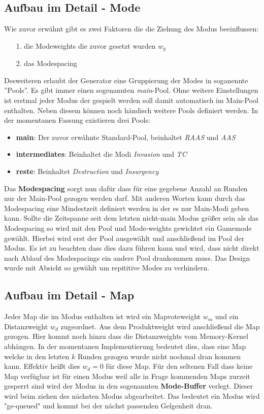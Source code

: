     \subsection{Aufbau im Detail - Mode}
        Wie zuvor erwähnt gibt es zwei Faktoren die die Ziehung des Modus beeinflussen:
        \begin{itemize}
            \item [1.] die Modeweights die zuvor gesetzt wurden $w_g$ 
            \item [2.] das Modespacing
        \end{itemize}
        Desweiteren erlaubt der Generator eine Gruppierung der Modes in soganennte ''Pools''. 
        Es gibt immer einen sogenannten \textit{main}-Pool. 
        Ohne weitere Einstellungen ist erstmal jeder Modus der gespielt werden soll damit automatisch im Main-Pool enthalten. 
        Neben diesem können noch händisch weitere Pools definiert werden. 
        In der momentanen Fassung existieren drei Pools:
        \begin{itemize}
            \item \textbf{main}: Der zuvor erwähnte Standard-Pool, beinhaltet \textit{RAAS} und \textit{AAS}
            \item \textbf{intermediates}: Beinhaltet die Modi \textit{Invasion} und \textit{TC}
            \item \textbf{reste}: Beinhaltet \textit{Destruction} und \textit{Insurgency}
        \end{itemize}
        Das \textbf{Modespacing} sorgt nun dafür dass für eine gegebene Anzahl an Runden nur der Main-Pool gezogen werden darf.
        Mit anderen Worten kann durch das Modespacing eine Mindestzeit definiert werden in der es nur Main-Modi geben kann. 
        Sollte die Zeitspanne seit dem letzten nicht-main Modus größer sein als das Modespacing so wird mit den Pool und Mode-weights gewichtet ein Gamemode gewählt. 
        Hierbei wird erst der Pool ausgewählt und anschließend im Pool der Modus. 
        Es ist zu beachten dass dies dazu führen kann und wird, dass nicht direkt nach Ablauf des Modespacings ein andere Pool drankommen muss. 
        Das Design wurde mit Absicht so gewählt um repititive Modes zu verhindern.

    \subsection{Aufbau im Detail - Map}
    Jeder Map die im Modus enthalten ist wird ein Mapvoteweight $w_m$ und ein Distanzweight $w_d$ zugeordnet. 
    Aus dem Produktweight wird anschließend die Map gezogen. 
    Hier kommt noch hinzu dass die Distanzweights vom Memory-Kernel abhängen. 
    In der momentanen Implementierung bedeutet dies, dass eine Map welche in den letzten $k$ Runden gezogen wurde nicht nochmal dran kommen kann. 
    Effektiv heißt dies $w_d=0$ für diese Map. 
    Für den seltenen Fall dass keine Map verfügbar ist für einen Modus weil alle in Frage kommenden Maps zurzeit gesperrt sind wird der Modus in den sogenannten \textbf{Mode-Buffer} verlegt. 
    Dieser wird beim ziehen des nächsten Modus abgearbeitet. 
    Das bedeutet ein Modus wird "ge-queued" und kommt bei der nächst passenden Gelgenheit dran. 
    
